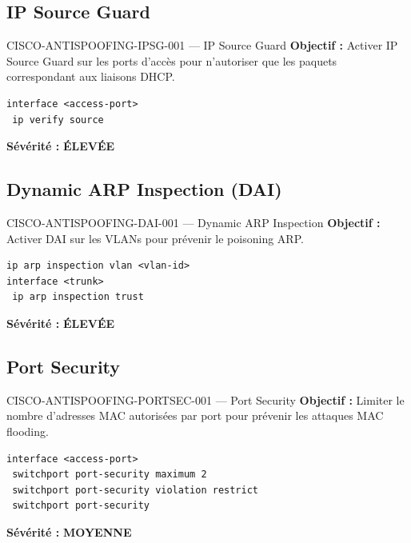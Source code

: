 \documentclass[12pt, a4paper]{report}
\begin{document}
\subsection{IP Source Guard}

\begin{rulebox}{CISCO-ANTISPOOFING-IPSG-001 — IP Source Guard}
  \textbf{Objectif :} Activer IP Source Guard sur les ports d'accès pour n'autoriser que les paquets correspondant aux liaisons DHCP.

  \begin{lstlisting}
interface <access-port>
 ip verify source
  \end{lstlisting}

  \textbf{Sévérité :} \textcolor{accentOrange}{\textbf{ÉLEVÉE}}
\end{rulebox}

\subsection{Dynamic ARP Inspection (DAI)}

\begin{rulebox}{CISCO-ANTISPOOFING-DAI-001 — Dynamic ARP Inspection}
  \textbf{Objectif :} Activer DAI sur les VLANs pour prévenir le poisoning ARP.

  \begin{lstlisting}
ip arp inspection vlan <vlan-id>
interface <trunk>
 ip arp inspection trust
  \end{lstlisting}

  \textbf{Sévérité :} \textcolor{accentOrange}{\textbf{ÉLEVÉE}}
\end{rulebox}

\subsection{Port Security}

\begin{rulebox}{CISCO-ANTISPOOFING-PORTSEC-001 — Port Security}
  \textbf{Objectif :} Limiter le nombre d'adresses MAC autorisées par port pour prévenir les attaques MAC flooding.

  \begin{lstlisting}
interface <access-port>
 switchport port-security maximum 2
 switchport port-security violation restrict
 switchport port-security
  \end{lstlisting}

  \textbf{Sévérité :} \textcolor{accentGreen}{\textbf{MOYENNE}}
\end{rulebox}
\end{document}
